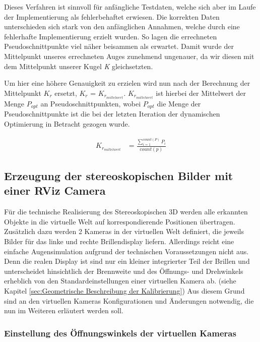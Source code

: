 Dieses Verfahren ist sinnvoll für anfängliche Testdaten, welche sich aber im Laufe der Implementierung als fehlerbehaftet erwiesen. Die korrekten Daten unterschieden sich stark von den anfänglichen Annahmen, welche durch eine fehlerhafte Implementierung erzielt wurden. So lagen die errechneten Pseudoschnittpunkte viel näher beisammen als erwartet. Damit wurde der Mittelpunkt unseres errechneten Auges zunehmend ungenauer, da wir diesen mit dem Mittelpunkt
unserer Kugel \emph{K} gleichsetzten.

Um hier eine höhere Genauigkeit zu erzielen wird nun nach der Berechnung der Mittelpunkt $K_r$ ersetzt, $K_r$ = $K_{r_{mittelwert}}$. $K_{r_{mittelwert}}$ ist hierbei der Mittelwert der Menge $P_{opt}$ an Pseudoschnittpunkten, wobei $P_{opt}$ die Menge der Pseudoschnittpunkte ist die bei der letzten Iteration der dynamischen Optimierung in Betracht gezogen wurde.


\begin{align}
K_{r_{mittelwert}} &= \frac{\sum\limits_{i=1}^{count(P)} P_i}{count(p)} 
\end{align}

\subsection{Erzeugung der stereoskopischen Bilder mit einer RViz Camera}
Für die technische Realisierung des Stereoskopischen 3D werden alle erkannten Objekte in die virtuelle Welt auf korrespondierende Positionen übertragen. 
Zusätzlich dazu werden 2 Kameras in der virtuellen Welt definiert, die jeweils Bilder für das linke und rechte Brillendisplay liefern. Allerdings reicht eine einfache Augensimulation aufgrund der technischen Voraussetzungen nicht aus. 
Denn die realen Display ist sind nur ein kleiner integrierter Teil der Brillen und unterscheidet hinsichtlich der Brennweite und des Öffnungs- und Drehwinkels erheblich von den Standardeinstellungen einer virtuellen Kamera ab. (siehe Kapitel \ref{sec:Geometrische Beschreibung der Kalibrierung})
Aus diesem Grund sind an den virtuellen Kameras Konfigurationen und Änderungen notwendig, die nun im Weiteren erläutert werden soll. 


\subsubsection{Einstellung des Öffnungswinkels der virtuellen Kameras}
\label{sec:virtuelle Kameras}


